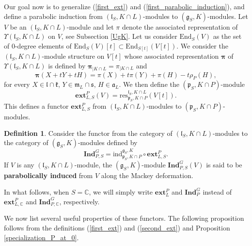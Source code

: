 \documentclass{amsart}
\theoremstyle{definition}
\newtheorem{definition}[theorem]{Definition}
\begin{document}
Our goal now is to generalize (\ref{first_ext}) and (\ref{first_parabolic_induction}), and define a parabolic induction from $(\mathfrak{l}_S,K\cap L)$-modules to $(\bm{\mathfrak{g}}_S, K)$-modules. Let $V$ be an $(\mathfrak{l}_S,K\cap L)$-module and let $\pi$ denote the associated representation of $\Upsilon(\mathfrak{l}_S, K\cap L)$ on $V$, see Subsection \ref{UgK}. Let us consider $\mathrm{End}_S(V)$ as the set  of $0$-degree elements of $\mathrm{End}_S(V)[t] \subset \mathrm{End}_{S[t]}(V[t])$. We consider the $(\bm{\mathfrak{l}}_S,K\cap L)$-module structure on $V[t]$ whose associated representation \(\bm{\pi}\) of \(\Upsilon(\bm{\mathfrak{l}}_S,K\cap L)\) is defined by $\bm{\pi}_{|K\cap L} = \pi_{|K\cap L}$ and
\begin{equation}\label{formula_second_ext}
    \bm{\pi}(X+tY + tH) = \pi(X) + t\pi(Y) +\pi(H) -t \rho_P(H),
\end{equation}
for every $X \in \mathfrak{l}\cap \mathfrak{k}$, $Y \in \mathfrak{m}_L \cap \mathfrak{s}$, $H \in \mathfrak{a}_L$.
We then define the $(\bm{\mathfrak{p}}_S, K\cap P)$-module
\begin{equation}\label{second_ext}
    \mathbf{ext}_{L,S}^P(V) = \mathrm{res}_{\bm{\mathfrak{p}}_S, K\cap P}^{\bm{\mathfrak{l}}_S,K\cap L}\left(V[t]\right).
\end{equation}
This defines a functor $\mathbf{ext}_{L,S}^P$ from $(\mathfrak{l}_S,K\cap L)$-modules to $(\bm{\mathfrak{p}}_S,K\cap P)$-modules.

\begin{definition}
    Consider the functor from the category of $(\mathfrak{l}_S,K\cap L)$-modules to the category of $(\bm{\mathfrak{g}}_S,K)$-modules defined by
    \[\mathbf{Ind}_{P,S}^G = \mathrm{ind}_{\bm{\mathfrak{p}}_S,K\cap P}^{\bm{\mathfrak{g}}_S,K} \circ \mathbf{ext}_{L,S}^P.\]
    If $V$ is any $(\mathfrak{l}_S,K\cap L)$-module, the $(\bm{\mathfrak{g}}_S,K)$-module $\mathbf{Ind}_{P,S}^G(V)$ is said to be \textbf{parabolically induced} from $V$ along the Mackey deformation.
\end{definition}

In what follows, when $S = \mathbb{C}$, we will simply write $\mathbf{ext}_L^P$ and $\mathbf{Ind}_P^G$ instead of $\mathbf{ext}_{L,\mathbb{C}}^P$ and $\mathbf{Ind}_{P,\mathbb{C}}^G$, respectively.

We now list several useful properties of these functors. The following proposition follows from the definitions (\ref{first_ext}) and (\ref{second_ext}) and Proposition \ref{specialization_P_at_0}.
\end{document}
